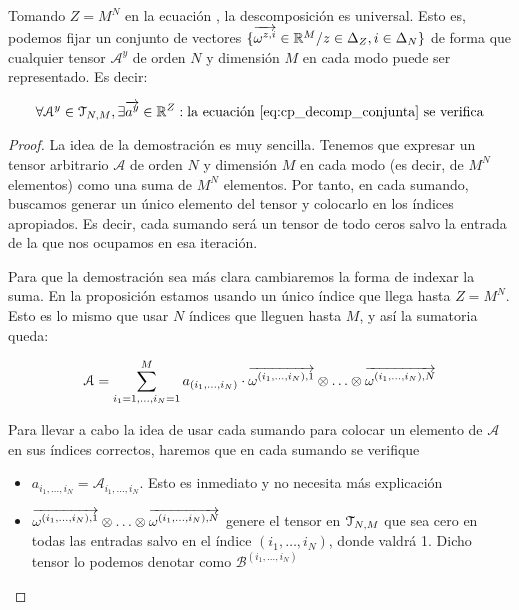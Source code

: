 \begin{proposicion}
    Tomando $Z = M^N$ en la ecuación , la descomposición es universal. Esto es, podemos fijar un conjunto de vectores $\{\overrightarrow{\omega^{z, i}} \in \mathbb{R}^M / z \in \Delta_{Z}, i \in \Delta_{N} \}$ de forma que cualquier tensor $\mathcal{A}^y$ de orden $N$ y dimensión $M$ en cada modo puede ser representado. Es decir:

    \begin{equation}
        \forall \mathcal{A}^y \in \espaciotensores{N}{M}, \exists \nv{a^y} \in \R^Z: \text{la ecuación \refeq{eq:cp_decomp_conjunta} se verifica}
    \end{equation}
\end{proposicion}

\begin{proof}
    La idea de la demostración es muy sencilla. Tenemos que expresar un tensor arbitrario $\mathcal{A}$ de orden $N$ y dimensión $M$ en cada modo (es decir, de $M^N$ elementos) como una suma de $M^N$ elementos. Por tanto, en cada sumando, buscamos generar un único elemento del tensor y colocarlo en los índices apropiados. Es decir, cada sumando será un tensor de todo ceros salvo la entrada de la que nos ocupamos en esa iteración.

    Para que la demostración sea más clara cambiaremos la forma de indexar la suma. En la proposición estamos usando un único índice que llega hasta $Z = M^N$. Esto es lo mismo que usar $N$ índices que lleguen hasta $M$, y así la sumatoria queda:

    \begin{equation}
        \mathcal{A} = \sum_{i_1 = 1, \ldots, i_N = 1}^M a_{(i_1, \ldots, i_N)} \cdot \overrightarrow{\omega^{(i_1, \ldots, i_N), 1}} \otimes \ldots \otimes \overrightarrow{\omega^{(i_1, \ldots, i_N), N}}
    \end{equation}

    Para llevar a cabo la idea de usar cada sumando para colocar un elemento de $\mathcal{A}$ en sus índices correctos, haremos que en cada sumando se verifique

    \begin{itemize}
        \item $a_{i_1, \ldots, i_N} = \mathcal{A}_{i_1, \ldots, i_N}$. Esto es inmediato y no necesita más explicación
        \item $\overrightarrow{\omega^{(i_1, \ldots, i_N), 1}} \otimes \ldots \otimes \overrightarrow{\omega^{(i_1, \ldots, i_N), N}}$ genere el tensor en $\mathcal{T}_{N, M}$ que sea cero en todas las entradas salvo en el índice $(i_1, \ldots, i_N)$, donde valdrá 1. Dicho tensor lo podemos denotar como  $\mathcal{B}^{(i_1, \ldots, i_N)}$
    \end{itemize}


\end{proof}
